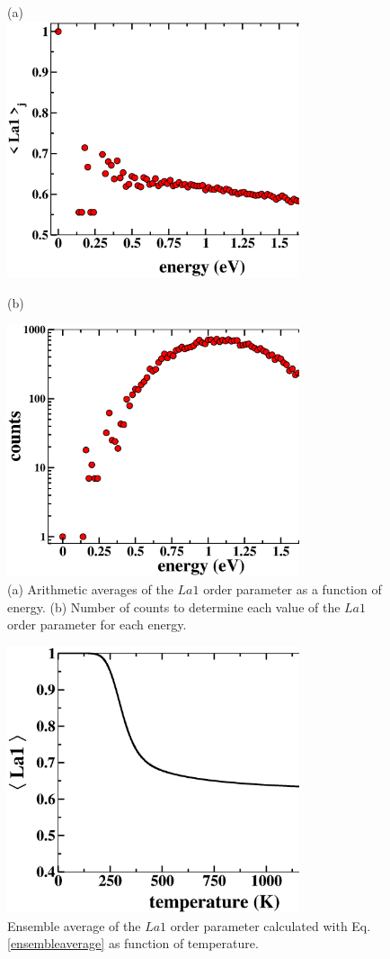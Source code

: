 \documentclass[aps,pre,reprint,superscriptaddress,showkeys]{revtex4-1}
\begin{document}
\begin{figure}[h!]
(a)\\
\includegraphics[width=8.6cm]{fig8a.eps}\\
\centerline{(b)}
\includegraphics[width=8.6cm]{fig8b.eps}
\caption{(a) Arithmetic averages of the $La1$ order parameter as a function of energy. (b) Number of counts to determine each value of the $La1$ order parameter for each energy. \label{arithemetic_avg}}
\end{figure}

\begin{figure}[h!]
\includegraphics[width=8.6cm]{fig9.eps}
\caption{Ensemble average of the $La1$ order parameter calculated with Eq. \ref{ensembleaverage} as function of temperature. \label{ensembleOP}}
\end{figure}
\end{document}
